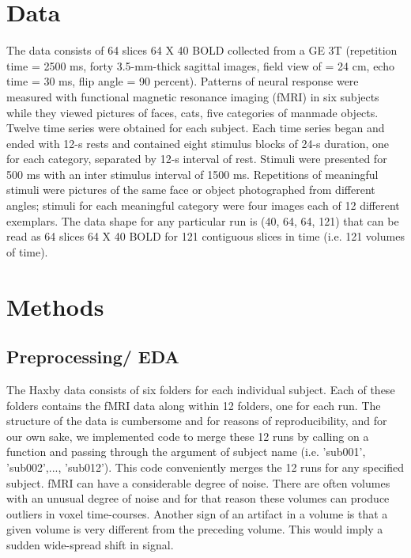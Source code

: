 \documentclass[11pt]{article}
\begin{document}
\section{Data}

The data consists of 64 slices  64 X 40 BOLD collected from a GE 3T (repetition 
time = 2500 ms, forty 3.5-mm-thick sagittal images, field view of = 24 cm, echo 
time = 30 ms, flip angle = 90 percent). Patterns of neural response were 
measured with functional magnetic resonance imaging (fMRI) in six subjects 
while they viewed pictures of faces, cats, five categories of manmade objects. 
Twelve time series were obtained for each subject. Each time series began and 
ended with 12-s rests and contained eight stimulus blocks of 24-s duration, one 
for each category, separated by 12-s interval of rest. Stimuli were presented 
for 500 ms with an inter stimulus interval of 1500 ms. Repetitions of 
meaningful stimuli were pictures of the same face or object photographed from 
different angles; stimuli for each meaningful category were four images each of 
12 different exemplars. The data shape for any particular run is (40, 64, 64, 
121) that can be read as 64 slices 64 X 40 BOLD for 121 contiguous slices in 
time (i.e. 121 volumes of time).


\section{Methods}

\subsection{Preprocessing/ EDA}

The Haxby data consists of six folders for each individual subject. Each of 
these folders contains the fMRI data along within 12 folders, one for each run. 
 The structure of the data is cumbersome and for reasons of reproducibility, 
and for our own sake, we implemented code to merge these 12 runs by calling on 
a function and passing through the argument of subject name (i.e. 'sub001', 
'sub002',..., 'sub012').  This code conveniently merges the 12 runs for any 
specified subject. fMRI can have a considerable degree of noise. There are 
often volumes with an unusual degree of noise and for that reason these volumes 
can produce outliers in voxel time-courses. Another sign of an artifact in a 
volume is that a given volume is very different from the preceding volume. This 
would imply a sudden wide-spread shift in signal. 
\end{document}
